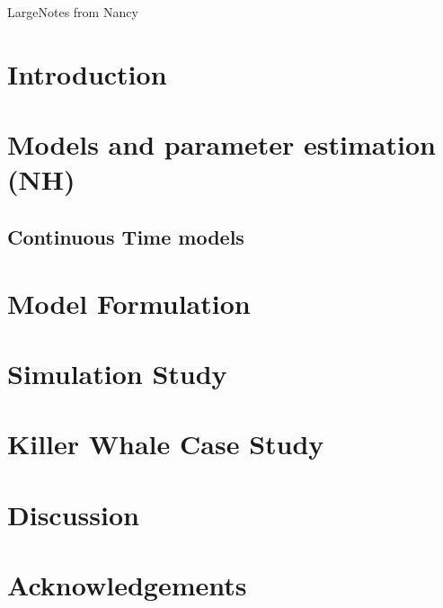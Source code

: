 \documentclass[12pt]{TD-CJS}
\begin{document}

\vfill\eject
{\centerline{Large{Notes from Nancy}}}

\vfill\eject

%
\section{Introduction}

%
\section{Models and parameter estimation (NH)}

%

%
%
\subsection{Continuous Time models}

%
\section{Model Formulation}

%
\section{Simulation Study}

%
\section{Killer Whale Case Study}

%
\section{Discussion}
%
%
\section{Acknowledgements}

\clearpage

\newcommand{\newblock}{}



\clearpage


\end{document}
